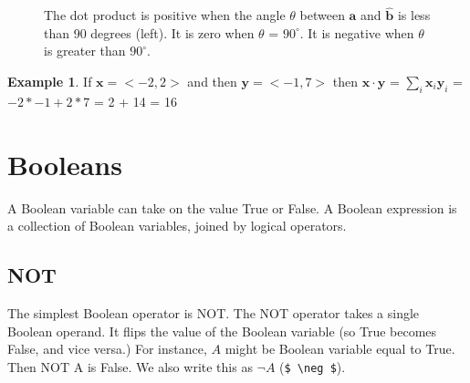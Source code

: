 \documentclass[]{article}
\theoremstyle{definition}
\newtheorem{exmp}{Example}[section]
\begin{document}
\begin{figure}[h]
     \centering
     \caption{The dot product is positive when the angle $\theta$ between $\bm{a}$  and $\hat{\bm{b}}$ is less than 90 degrees (left). It is zero when $\theta$ = $90^{\circ}$. It is negative when $\theta$ is greater than  $90^{\circ}$.}
     \label{steady_state}
\end{figure}

\begin{exmp}
If $ \mathbf{x}=<-2,2> $ and then $ \mathbf{y}=<-1,7> $ then $\bm{x} \cdot \bm{y}$ =  $\sum_i \bm{x}_i \bm{y}_i$ = $-2 * -1 + 2 * 7$ = 2 + 14 = 16
\end{exmp}

\section{Booleans}

A Boolean variable can take on the value True or False. A Boolean expression is a collection of Boolean variables, joined by logical operators.

\subsection{NOT}

The simplest Boolean operator is NOT. The NOT operator takes a single Boolean operand. It flips the value of the Boolean variable (so True becomes False, and vice versa.) For instance, $A$ might be Boolean variable equal to True. Then NOT A is False. We also write this as $\neg A$ (\verb|$ \neg $|).
\end{document}
